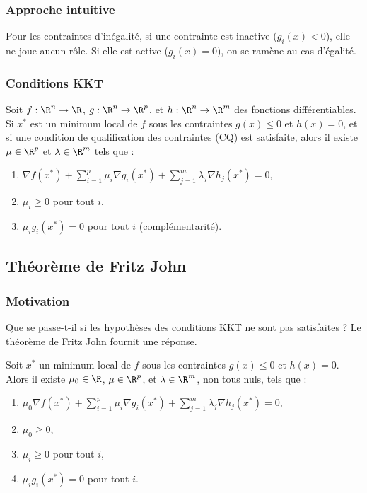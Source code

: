 \subsubsection{Approche intuitive}
Pour les contraintes d'inégalité, si une contrainte est inactive (\( g_i(x) < 0 \)), elle ne joue aucun rôle. Si elle est active (\( g_i(x) = 0 \)), on se ramène au cas d'égalité.

\subsubsection{Conditions KKT}
\begin{theorem}
    Soit \( f : \R^n \to \R \), \( g : \R^n \to \R^p \), et \( h : \R^n \to \R^m \) des fonctions différentiables. Si \( x^* \) est un minimum local de \( f \) sous les contraintes \( g(x) \leq 0 \) et \( h(x) = 0 \), et si une condition de qualification des contraintes (CQ) est satisfaite, alors il existe \( \mu \in \R^p \) et \( \lambda \in \R^m \) tels que :
    \begin{enumerate}[label=\roman*)]
        \item \( \nabla f(x^*) + \sum_{i=1}^p \mu_i \nabla g_i(x^*) + \sum_{j=1}^m \lambda_j \nabla h_j(x^*) = 0 \),
        \item \( \mu_i \geq 0 \) pour tout \( i \),
        \item \( \mu_i g_i(x^*) = 0 \) pour tout \( i \) (complémentarité).
    \end{enumerate}
\end{theorem}

\subsection{Théorème de Fritz John}
\subsubsection{Motivation}
Que se passe-t-il si les hypothèses des conditions KKT ne sont pas satisfaites ? Le théorème de Fritz John fournit une réponse.

\begin{theorem}
    Soit \( x^* \) un minimum local de \( f \) sous les contraintes \( g(x) \leq 0 \) et \( h(x) = 0 \). Alors il existe \( \mu_0 \in \R \), \( \mu \in \R^p \), et \( \lambda \in \R^m \), non tous nuls, tels que :
    \begin{enumerate}[label=\roman*)]
        \item \( \mu_0 \nabla f(x^*) + \sum_{i=1}^p \mu_i \nabla g_i(x^*) + \sum_{j=1}^m \lambda_j \nabla h_j(x^*) = 0 \),
        \item \( \mu_0 \geq 0 \),
        \item \( \mu_i \geq 0 \) pour tout \( i \),
        \item \( \mu_i g_i(x^*) = 0 \) pour tout \( i \).
    \end{enumerate}
\end{theorem}

